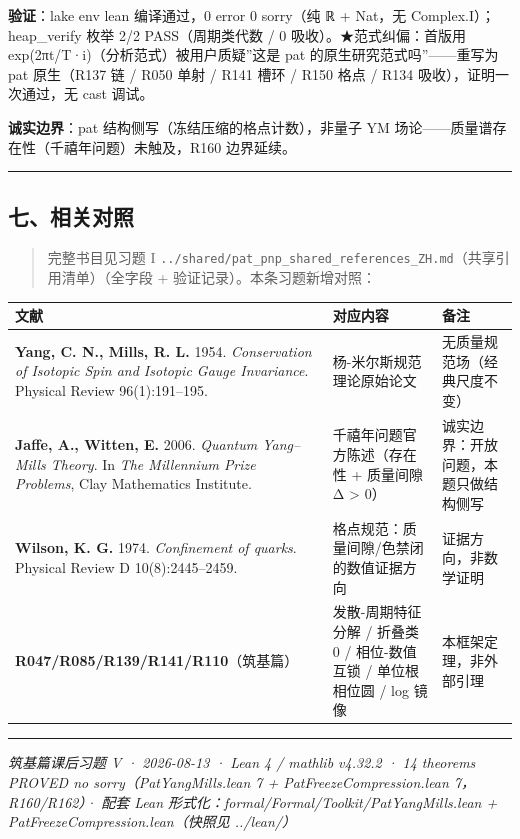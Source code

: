 \documentclass[
]{article}
\newcounter{none} %
\begin{document}
\textbf{验证}：lake env lean 编译通过，0 error 0 sorry（纯 ℝ + Nat，无
Complex.I）；heap\_verify 枚举 2/2 PASS（周期类代数 / 0
吸收）。★范式纠偏：首版用 exp(2πt/T·i)（分析范式）被用户质疑''这是 pat
的原生研究范式吗''------重写为 pat 原生（R137 链 / R050 单射 / R141 槽环
/ R150 格点 / R134 吸收），证明一次通过，无 cast 调试。

\textbf{诚实边界}：pat 结构侧写（冻结压缩的格点计数），非量子 YM
场论------质量谱存在性（千禧年问题）未触及，R160 边界延续。

\begin{center}\rule{0.5\linewidth}{0.5pt}\end{center}

\subsection{七、相关对照}\label{ux4e03ux76f8ux5173ux5bf9ux7167}

\begin{quote}
完整书目见习题 I
\texttt{../shared/pat\_pnp\_shared\_references\_ZH.md}（共享引用清单）（全字段
+ 验证记录）。本条习题新增对照：
\end{quote}

{\def\LTcaptype{none} %
\begin{longtable}[]{@{}
  >{\raggedright\arraybackslash}p{}
  >{\raggedright\arraybackslash}p{}
  >{\raggedright\arraybackslash}p{}@{}}
\toprule\noalign{}
\begin{minipage}[b]{\linewidth}\raggedright
文献
\end{minipage} & \begin{minipage}[b]{\linewidth}\raggedright
对应内容
\end{minipage} & \begin{minipage}[b]{\linewidth}\raggedright
备注
\end{minipage} \\
\midrule\noalign{}
\endhead
\bottomrule\noalign{}
\endlastfoot
\textbf{Yang, C. N., Mills, R. L.} 1954. \emph{Conservation of Isotopic
Spin and Isotopic Gauge Invariance}. Physical Review 96(1):191--195. &
杨-米尔斯规范理论原始论文 & 无质量规范场（经典尺度不变） \\
\textbf{Jaffe, A., Witten, E.} 2006. \emph{Quantum Yang--Mills Theory}.
In \emph{The Millennium Prize Problems}, Clay Mathematics Institute. &
千禧年问题官方陈述（存在性 + 质量间隙 Δ \textgreater{} 0） &
诚实边界：开放问题，本题只做结构侧写 \\
\textbf{Wilson, K. G.} 1974. \emph{Confinement of quarks}. Physical
Review D 10(8):2445--2459. & 格点规范：质量间隙/色禁闭的数值证据方向 &
证据方向，非数学证明 \\
\textbf{R047/R085/R139/R141/R110}（筑基篇） & 发散-周期特征分解 / 折叠类
0 / 相位-数值互锁 / 单位根相位圆 / log 镜像 & 本框架定理，非外部引理 \\
\end{longtable}
}

\begin{center}\rule{0.5\linewidth}{0.5pt}\end{center}

\emph{筑基篇课后习题 V · 2026-08-13 · Lean 4 / mathlib v4.32.2 · 14
theorems PROVED no sorry（PatYangMills.lean 7 +
PatFreezeCompression.lean 7，R160/R162）· 配套 Lean
形式化：formal/Formal/Toolkit/PatYangMills.lean +
PatFreezeCompression.lean（快照见 ../lean/）}
\end{document}
